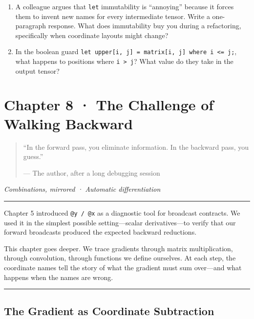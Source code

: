 \documentclass[11pt,]{article}
\begin{document}
\begin{enumerate}
\def\labelenumi{\arabic{enumi}.}
\setcounter{enumi}{1}
\item
  A colleague argues that \texttt{let} immutability is ``annoying''
  because it forces them to invent new names for every intermediate
  tensor. Write a one-paragraph response. What does immutability buy you
  during a refactoring, specifically when coordinate layouts might
  change?
\item
  In the boolean guard
  \texttt{let\ upper{[}i,\ j{]}\ =\ matrix{[}i,\ j{]}\ where\ i\ \textless{}=\ j;},
  what happens to positions where \texttt{i\ \textgreater{}\ j}? What
  value do they take in the output tensor?
\end{enumerate}

\newpage

\hypertarget{chapter-8-the-challenge-of-walking-backward}{%
\section{Chapter 8 · The Challenge of Walking
Backward}\label{chapter-8-the-challenge-of-walking-backward}}

\begin{quote}
``In the forward pass, you eliminate information. In the backward pass,
you guess.''

--- The author, after a long debugging session
\end{quote}

\emph{Combinations, mirrored · Automatic differentiation}

\begin{center}\rule{0.5\linewidth}{0.4pt}\end{center}

Chapter 5 introduced \texttt{@y\ /\ @x} as a diagnostic tool for
broadcast contracts. We used it in the simplest possible
setting---scalar derivatives---to verify that our forward broadcasts
produced the expected backward reductions.

This chapter goes deeper. We trace gradients through matrix
multiplication, through convolution, through functions we define
ourselves. At each step, the coordinate names tell the story of what the
gradient must sum over---and what happens when the names are wrong.

\begin{center}\rule{0.5\linewidth}{0.4pt}\end{center}

\hypertarget{the-gradient-as-coordinate-subtraction}{%
\subsection{The Gradient as Coordinate
Subtraction}\label{the-gradient-as-coordinate-subtraction}}
\end{document}
